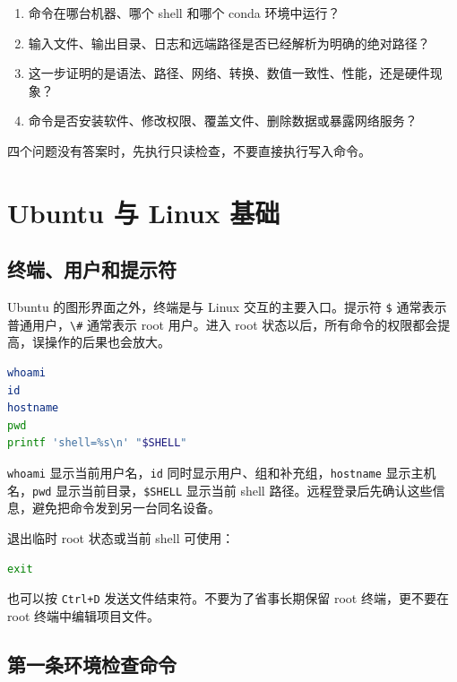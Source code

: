 \begin{enumerate}
\def\labelenumi{\arabic{enumi}.}
\tightlist
\item
  命令在哪台机器、哪个 shell 和哪个 conda 环境中运行？
\item
  输入文件、输出目录、日志和远端路径是否已经解析为明确的绝对路径？
\item
  这一步证明的是语法、路径、网络、转换、数值一致性、性能，还是硬件现象？
\item
  命令是否安装软件、修改权限、覆盖文件、删除数据或暴露网络服务？
\end{enumerate}

四个问题没有答案时，先执行只读检查，不要直接执行写入命令。

\section{Ubuntu 与 Linux 基础}\label{ubuntu-ux4e0e-linux-ux57faux7840}

\subsection{终端、用户和提示符}\label{ux7ec8ux7aefux7528ux6237ux548cux63d0ux793aux7b26}

Ubuntu 的图形界面之外，终端是与 Linux 交互的主要入口。提示符
\passthrough{\lstinline!$!}
通常表示普通用户，\passthrough{\lstinline!\#!} 通常表示 root 用户。进入
root 状态以后，所有命令的权限都会提高，误操作的后果也会放大。

\begin{lstlisting}[language=bash]
whoami
id
hostname
pwd
printf 'shell=%s\n' "$SHELL"
\end{lstlisting}

\passthrough{\lstinline!whoami!}
显示当前用户名，\passthrough{\lstinline!id!}
同时显示用户、组和补充组，\passthrough{\lstinline!hostname!}
显示主机名，\passthrough{\lstinline!pwd!}
显示当前目录，\passthrough{\lstinline!$SHELL!} 显示当前 shell
路径。远程登录后先确认这些信息，避免把命令发到另一台同名设备。

退出临时 root 状态或当前 shell 可使用：

\begin{lstlisting}[language=bash]
exit
\end{lstlisting}

也可以按 \passthrough{\lstinline!Ctrl+D!}
发送文件结束符。不要为了省事长期保留 root 终端，更不要在 root
终端中编辑项目文件。

\subsection{第一条环境检查命令}\label{ux7b2cux4e00ux6761ux73afux5883ux68c0ux67e5ux547dux4ee4}

